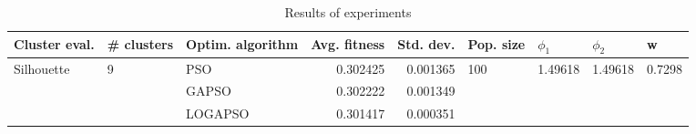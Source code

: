 \begin{table}
\centering
\caption{Results of experiments}
\begin{tabular}{lllrrllll}
\toprule
              Cluster eval. &        \# clusters & Optim. algorithm &  Avg. fitness &  Std. dev. &            Pop. size &               $\phi_{1}$ &               $\phi_{2}$ &                       w \\
\midrule
\multirow{3}{*}{Silhouette} & \multirow{3}{*}{9} &              PSO &      0.302425 &   0.001365 & \multirow{3}{*}{100} & \multirow{3}{*}{1.49618} & \multirow{3}{*}{1.49618} & \multirow{3}{*}{0.7298} \\
                            &                    &            GAPSO &      0.302222 &   0.001349 &                      &                          &                          &                         \\
                            &                    &          LOGAPSO &      0.301417 &   0.000351 &                      &                          &                          &                         \\
\bottomrule
\end{tabular}
\end{table}

